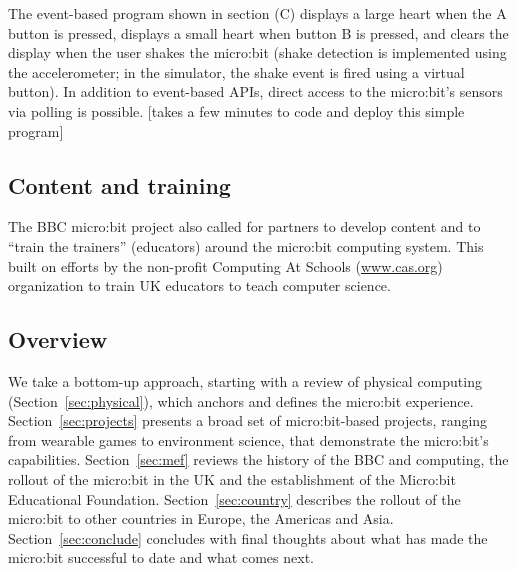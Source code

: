 The event-based program shown in section (C) displays a large heart when the
A button is pressed, displays a small heart when button B is pressed,
and clears the display when the user shakes the micro:bit (shake
detection is implemented using the accelerometer; in the simulator, the
shake event is fired using a virtual button). In addition to event-based
APIs, direct access to the micro:bit's sensors via polling is possible.
[takes a few minutes to code and deploy this simple program]

\subsection{Content and training}

The BBC micro:bit project also called for partners to develop content
and to ``train the trainers'' (educators) around the micro:bit computing
system.  This built on efforts by the non-profit Computing At Schools
(\url{www.cas.org}) organization to train UK educators to teach computer
science. 






\subsection{Overview}

We take a bottom-up approach, starting with a review of
physical computing (Section~\ref{sec:physical}), which anchors 
and defines the micro:bit experience. Section~\ref{sec:projects}
presents a broad set of micro:bit-based projects, ranging
from wearable games to environment science, that demonstrate
the micro:bit's capabilities.  Section~\ref{sec:mef} reviews
the history of the BBC and computing, the rollout of the
micro:bit in the UK and the establishment of the Micro:bit
Educational Foundation.  Section~\ref{sec:country}
describes the rollout of the micro:bit to other countries
in Europe, the Americas and Asia. Section~\ref{sec:conclude}
concludes with final thoughts about what has made the micro:bit
successful to date and what comes next. 


